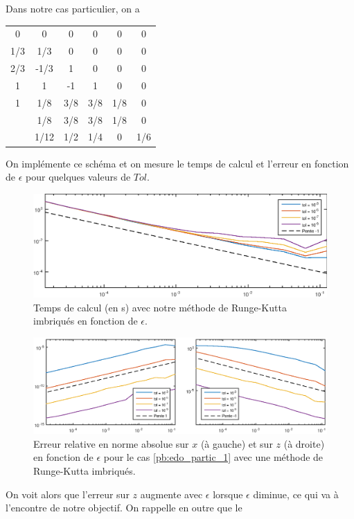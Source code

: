 Dans notre cas particulier, on a 
\begin{center}
\begin{tabular}{c|ccccc}
 0  &  0   &  0  &  0  &  0  &  0  \\
1/3 & 1/3  &  0  &  0  &  0  &  0  \\
2/3 & -1/3 &  1  &  0  &  0  &  0  \\
 1  &  1   & -1  &  1  &  0  &  0  \\
 1  & 1/8  & 3/8 & 3/8 & 1/8 &  0  \\ \hline
    & 1/8  & 3/8 & 3/8 & 1/8 &  0  \\ 
    & 1/12 & 1/2 & 1/4 &  0  & 1/6
\end{tabular}
\end{center}
On implémente ce schéma et on mesure le temps de calcul et l'erreur en fonction de $\epsilon$ pour quelques valeurs de $Tol$. 
\begin{figure}[!h]
\centering
\includegraphics[width=.8\textwidth]{img/chap1/cost_rke.eps}
\caption{Temps de calcul (en s) avec notre méthode de Runge-Kutta imbriqués en fonction de $\epsilon$.}
\label{fig:cout_rke}
\end{figure}
\begin{figure}[!h]
\centering
\includegraphics[width=\textwidth]{img/ann/conv_rel_rke.eps}
\caption{Erreur relative en norme absolue sur $x$ (à gauche) et sur $z$ (à droite) en fonction de $\epsilon$ pour le cas \eqref{pb:edo_partic_1} avec une méthode de Runge-Kutta imbriqués.}
\end{figure}

On voit alors que l'erreur sur $z$ augmente avec $\epsilon$ lorsque $\epsilon$ diminue, ce qui va à l'encontre de notre objectif. 
On rappelle en outre que le 


